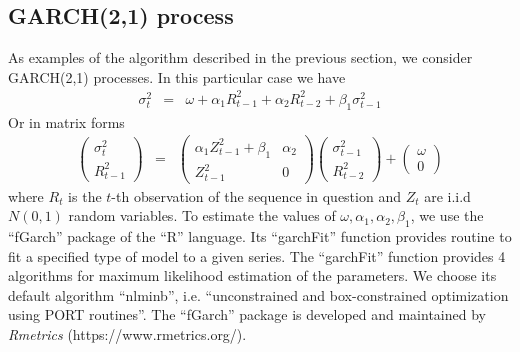 \documentclass[aoas,preprint]{imsart}
\numberwithin{equation}{section}
\theoremstyle{plain}
\begin{document}
\subsection{GARCH(2,1) process}
As examples of the algorithm described in the previous section, we
consider GARCH(2,1) processes. In this particular case we have
\begin{eqnarray*}
  \sigma_t^2 &=& \omega + \alpha_1 R_{t-1}^2 + \alpha_2 R_{t-2}^2 +
  \beta_1 \sigma_{t-1}^2
\end{eqnarray*}
Or in matrix forms
\begin{eqnarray*}
  \begin{pmatrix}
    \sigma_t^2 \\
    R_{t-1}^2
  \end{pmatrix}
  &=&
  \begin{pmatrix}
  \alpha_1 Z_{t-1}^2 + \beta_1 & \alpha_2 \\
  Z_{t-1}^2 & 0
  \end{pmatrix}
  \begin{pmatrix}
    \sigma_{t-1}^2 \\
    R_{t-2}^2
  \end{pmatrix}
  +
  \begin{pmatrix}
    \omega \\
    0
  \end{pmatrix}
\end{eqnarray*}
where $R_t$ is the $t$-th observation of the sequence in question and
$Z_t$ are i.i.d $N(0,1)$ random variables. To estimate the 
values of $\omega, \alpha_1, \alpha_2, \beta_1$, we use the ``fGarch''
package of the ``R'' language. Its ``garchFit'' function provides
routine to fit a specified type of model to a given series.
The ``garchFit'' function provides 4 algorithms for maximum likelihood
estimation of the parameters. We choose its default algorithm ``nlminb'',
i.e. ``unconstrained and box-constrained optimization using PORT
routines''. The ``fGarch'' package is developed and maintained by {\it
Rmetrics} (https://www.rmetrics.org/).

  
\end{document}
